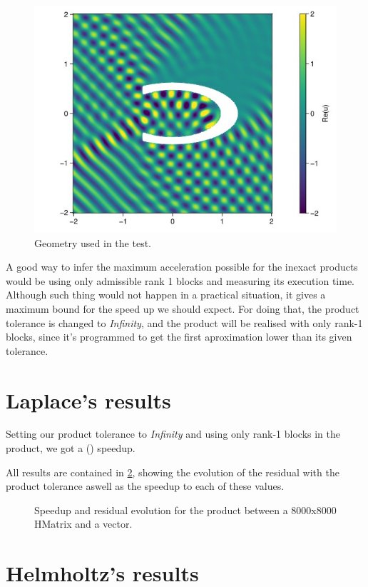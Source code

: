 \begin{figure}[h!]
    \centering
    \includegraphics[width=0.6\linewidth]{images/cavity_fig.jpg}
    \caption{Geometry used in the test.}
    \label{fig:cavity_fig}
\end{figure}

A good way to infer the maximum acceleration possible for the inexact products would be using only admissible rank 1 blocks and measuring its execution time. Although such thing would not happen in a practical situation, it gives a maximum bound for the speed up we should expect.
For doing that, the product tolerance is changed to \textit{Infinity}, and the product will be realised with only rank-1 blocks, since it's programmed to get the first aproximation lower than its given tolerance.

\section{Laplace's results}

Setting our product tolerance to \textit{Infinity} and using only rank-1 blocks in the product, we got a () speedup.

All results are contained in \ref{fig:laplace_results}, showing the evolution of the residual with the product tolerance aswell as the speedup to each of these values.

\begin{figure}[h!]
    \centering
    
    \caption{Speedup and residual evolution for the product between a 8000x8000 HMatrix and a vector.}
    \label{fig:laplace_results}
\end{figure}

\section{Helmholtz's results}

